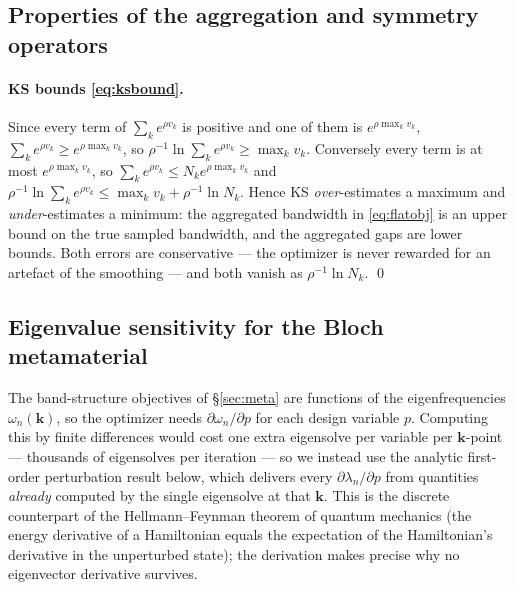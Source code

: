 \documentclass[11pt]{article}
\begin{document}
\subsection{Properties of the aggregation and symmetry operators}
\label{app:opprops}
\paragraph{KS bounds \eqref{eq:ksbound}.} Since every term of
$\sum_k e^{\rho v_k}$ is positive and one of them is $e^{\rho\max_k v_k}$,
$\sum_k e^{\rho v_k}\ge e^{\rho\max_k v_k}$, so
$\rho^{-1}\ln\sum_k e^{\rho v_k}\ge\max_k v_k$. Conversely every term is at most
$e^{\rho\max_k v_k}$, so $\sum_k e^{\rho v_k}\le N_ke^{\rho\max_k v_k}$ and
$\rho^{-1}\ln\sum_k e^{\rho v_k}\le\max_k v_k+\rho^{-1}\ln N_k$. Hence KS
\emph{over}-estimates a maximum and \emph{under}-estimates a minimum: the
aggregated bandwidth in \eqref{eq:flatobj} is an upper bound on the true sampled
bandwidth, and the aggregated gaps are lower bounds. Both errors are conservative
--- the optimizer is never rewarded for an artefact of the smoothing --- and both
vanish as $\rho^{-1}\ln N_k$. \qed
\subsection{Eigenvalue sensitivity for the Bloch metamaterial}
\label{sec:app:hf}
The band-structure objectives of \S\ref{sec:meta} are functions of the
eigenfrequencies $\omega_n(\mathbf k)$, so the optimizer needs
$\partial\omega_n/\partial p$ for each design variable $p$. Computing this by
finite differences would cost one extra eigensolve per variable per
$\mathbf k$-point --- thousands of eigensolves per iteration --- so we instead
use the analytic first-order perturbation result below, which delivers every
$\partial\lambda_n/\partial p$ from quantities \emph{already} computed by the
single eigensolve at that $\mathbf k$. This is the discrete counterpart of the
Hellmann--Feynman theorem of quantum mechanics (the energy derivative of a
Hamiltonian equals the expectation of the Hamiltonian's derivative in the
unperturbed state); the derivation makes precise why no eigenvector derivative
survives.
\end{document}
